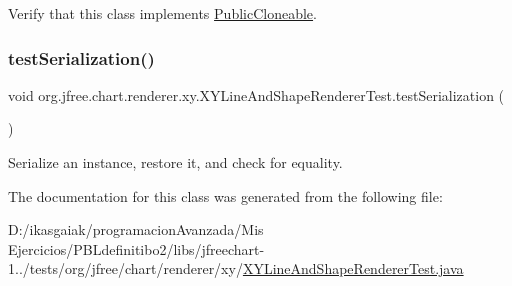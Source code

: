 Verify that this class implements \mbox{\hyperlink{}{Public\+Cloneable}}. \mbox{\label{classorg_1_1jfree_1_1chart_1_1renderer_1_1xy_1_1_x_y_line_and_shape_renderer_test_ade348bd672bdaf268a00fd27f9d7a929}} 
\subsubsection{\texorpdfstring{test\+Serialization()}{testSerialization()}}
{\footnotesize\ttfamily void org.\+jfree.\+chart.\+renderer.\+xy.\+X\+Y\+Line\+And\+Shape\+Renderer\+Test.\+test\+Serialization (\begin{DoxyParamCaption}{ }\end{DoxyParamCaption})}

Serialize an instance, restore it, and check for equality. 

The documentation for this class was generated from the following file\+:\begin{DoxyCompactItemize}
\item 
D\+:/ikasgaiak/programacion\+Avanzada/\+Mis Ejercicios/\+P\+B\+Ldefinitibo2/libs/jfreechart-\/1../tests/org/jfree/chart/renderer/xy/\mbox{\hyperlink{_x_y_line_and_shape_renderer_test_8java}{X\+Y\+Line\+And\+Shape\+Renderer\+Test.\+java}}\end{DoxyCompactItemize}
